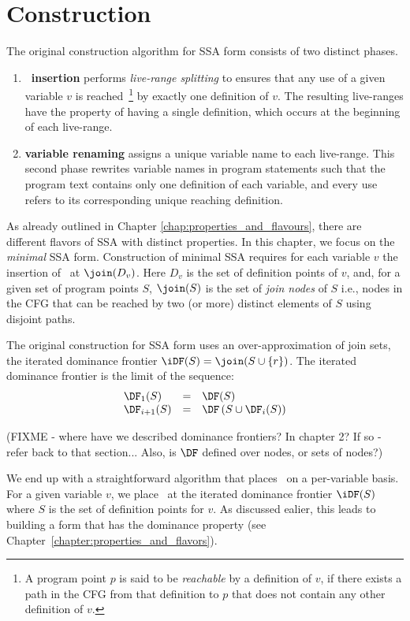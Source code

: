 \section{Construction}
The original construction algorithm for SSA form 
consists of two distinct phases.
\begin{enumerate}
\item \textbf{\phiop\ insertion} performs \textit{live-range splitting} to ensures that any use of a given variable $v$ is reached~\footnote{A program point $p$ is said to be \emph{reachable} by a definition of $v$, if there exists a path in the CFG from that definition to $p$ that does not contain any other definition of $v$.}  by exactly one definition of $v$. 
The resulting live-ranges have the property of having a single definition, which occurs at the beginning of each live-range.
\item \textbf{variable renaming} assigns a unique variable name to each live-range. This second phase rewrites variable names in program statements such that the program text contains only one definition of each variable, and every use refers to its corresponding unique reaching definition.
\end{enumerate}

As already outlined in Chapter \ref{chap:properties_and_flavours},
there are different flavors of SSA with distinct properties.
In this chapter, we focus on the \textit{minimal} SSA form.
Construction of minimal SSA 
requires for each variable $v$ the insertion of \phiops\ at $\join(D_v)$.
Here $D_v$ is the set of definition points of $v$, and,
for a given set of program points $S$, $\join(S)$ is the set of \textit{join nodes} of $S$
i.e., nodes in the CFG that can be reached by
two (or more) distinct elements of $S$ using disjoint paths.
 
The original construction for SSA form uses an over-approximation of join sets, the iterated dominance frontier $\iDF(S)=\join(S\cup \{r\})$. 
The iterated dominance frontier is the limit of the sequence:
$$\begin{array}{lll}
\DF_1(S) & = & \DF(S)\\
\DF_{i+1}(S) & = & \DF\left(S\cup \DF_i(S)\right)
\end{array}$$

(FIXME - where have we described dominance frontiers? In chapter 2?
If so - refer back to that section...
Also, is $\DF$ defined over nodes, or sets of nodes?)

We end up with a straightforward algorithm that places \phiops\ on a per-variable basis.
For a given variable $v$, we place \phiops\ at the iterated dominance frontier $\iDF(S)$ where $S$ is the set of definition points for $v$.
As discussed ealier, this leads to building a form that has the dominance property (see Chapter~\ref{chapter:properties_and_flavors}).

